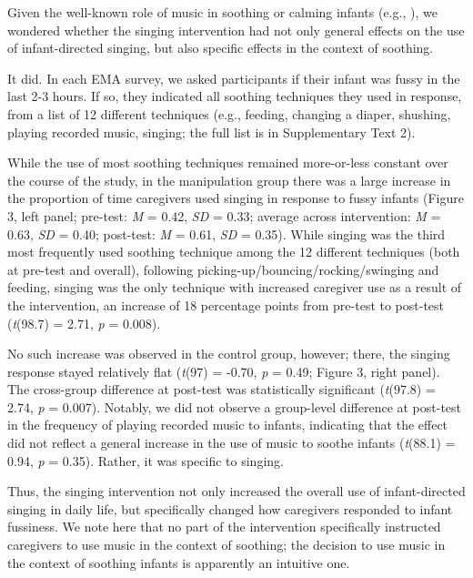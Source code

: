 \documentclass[
]{article}
\begin{document}
Given the well-known role of music in soothing or calming infants (e.g.,
), we
wondered whether the singing intervention had not only general effects
on the use of infant-directed singing, but also specific effects in the
context of soothing.

It did. In each EMA survey, we asked participants if their infant was
fussy in the last 2-3 hours. If so, they indicated all soothing
techniques they used in response, from a list of 12 different techniques
(e.g., feeding, changing a diaper, shushing, playing recorded music,
singing; the full list is in Supplementary Text 2).

While the use of most soothing techniques remained more-or-less constant
over the course of the study, in the manipulation group there was a
large increase in the proportion of time caregivers used singing in
response to fussy infants (Figure 3, left panel; pre-test: \emph{M} =
0.42, \emph{SD} = 0.33; average across intervention: \emph{M} = 0.63,
\emph{SD} = 0.40; post-test: \emph{M} = 0.61, \emph{SD} = 0.35). While
singing was the third most frequently used soothing technique among the
12 different techniques (both at pre-test and overall), following
picking-up/bouncing/rocking/swinging and feeding, singing was the only
technique with increased caregiver use as a result of the intervention,
an increase of 18 percentage points from pre-test to post-test
(\emph{t}(98.7) = 2.71, \emph{p} = 0.008).

No such increase was observed in the control group, however; there, the
singing response stayed relatively flat (\emph{t}(97) = -0.70, \emph{p}
= 0.49; Figure 3, right panel). The cross-group difference at post-test
was statistically significant (\emph{t}(97.8) = 2.74, \emph{p} = 0.007).
Notably, we did not observe a group-level difference at post-test in the
frequency of playing recorded music to infants, indicating that the
effect did not reflect a general increase in the use of music to soothe
infants (\emph{t}(88.1) = 0.94, \emph{p} = 0.35). Rather, it was
specific to singing.

Thus, the singing intervention not only increased the overall use of
infant-directed singing in daily life, but specifically changed how
caregivers responded to infant fussiness. We note here that no part of
the intervention specifically instructed caregivers to use music in the
context of soothing; the decision to use music in the context of
soothing infants is apparently an intuitive one.
\end{document}
